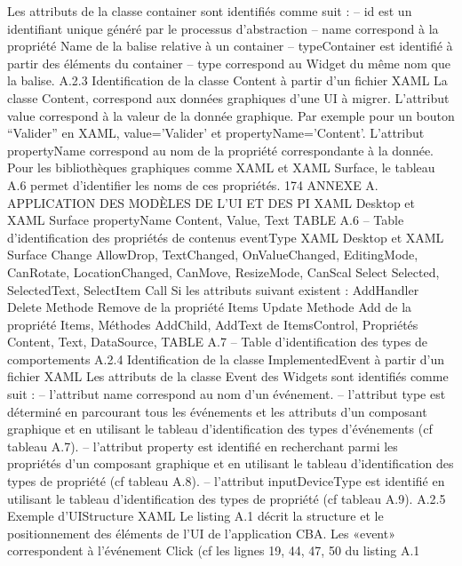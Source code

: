 \documentclass{article}
\begin{document}
Les attributs de la classe container sont identiﬁ\'{e}s comme suit :
– id est un identiﬁant unique g\'{e}n\'{e}r\'{e} par le processus d’abstraction
– name correspond \`{a} la propri\'{e}t\'{e} Name de la balise relative \`{a} un container
– typeContainer est identiﬁ\'{e} \`{a} partir des \'{e}l\'{e}ments du container
– type correspond au Widget du m\^{e}me nom que la balise.
A.2.3
Identiﬁcation de la classe Content \`{a} partir d’un ﬁchier XAML
La classe Content, correspond aux donn\'{e}es graphiques d’une UI \`{a} migrer. L’attribut value correspond \`{a} la valeur de la donn\'{e}e graphique. Par exemple pour un bouton “Valider” en XAML, value=’Valider’ et propertyName=’Content’. L’attribut propertyName correspond au nom de la propri\'{e}t\'{e}
correspondante \`{a} la donn\'{e}e. Pour les biblioth\`{e}ques graphiques comme XAML et XAML Surface, le
tableau A.6 permet d’identiﬁer les noms de ces propri\'{e}t\'{e}s.
174
ANNEXE A. APPLICATION DES MODÈLES DE L’UI ET DES PI
XAML Desktop et XAML Surface
propertyName
Content, Value, Text
TABLE A.6 – Table d’identiﬁcation des propri\'{e}t\'{e}s de contenus
eventType
XAML Desktop et XAML Surface
Change
AllowDrop, TextChanged, OnValueChanged, EditingMode, CanRotate,
LocationChanged, CanMove, ResizeMode, CanScal
Select
Selected, SelectedText, SelectItem
Call
Si les attributs suivant existent : AddHandler
Delete
Methode Remove de la propri\'{e}t\'{e} Items
Update
Methode Add de la propri\'{e}t\'{e} Items, M\'{e}thodes AddChild, AddText de ItemsControl,
Propri\'{e}t\'{e}s Content, Text, DataSource,
TABLE A.7 – Table d’identiﬁcation des types de comportements
A.2.4
Identiﬁcation de la classe ImplementedEvent \`{a} partir d’un ﬁchier XAML
Les attributs de la classe Event des Widgets sont identiﬁ\'{e}s comme suit :
– l’attribut name correspond au nom d’un \'{e}v\'{e}nement.
– l’attribut type est d\'{e}termin\'{e} en parcourant tous les \'{e}v\'{e}nements et les attributs d’un composant
graphique et en utilisant le tableau d’identiﬁcation des types d’\'{e}v\'{e}nements (cf tableau A.7).
– l’attribut property est identiﬁ\'{e} en recherchant parmi les propri\'{e}t\'{e}s d’un composant graphique
et en utilisant le tableau d’identiﬁcation des types de propri\'{e}t\'{e} (cf tableau A.8).
– l’attribut inputDeviceType est identiﬁ\'{e} en utilisant le tableau d’identiﬁcation des types de propri\'{e}t\'{e} (cf tableau A.9).
A.2.5
Exemple d’UIStructure XAML
Le listing A.1 d\'{e}crit la structure et le positionnement des \'{e}l\'{e}ments de l’UI de l’application
CBA. Les «event» correspondent \`{a} l’\'{e}v\'{e}nement Click (cf les lignes 19, 44, 47, 50 du listing A.1
\end{document}
